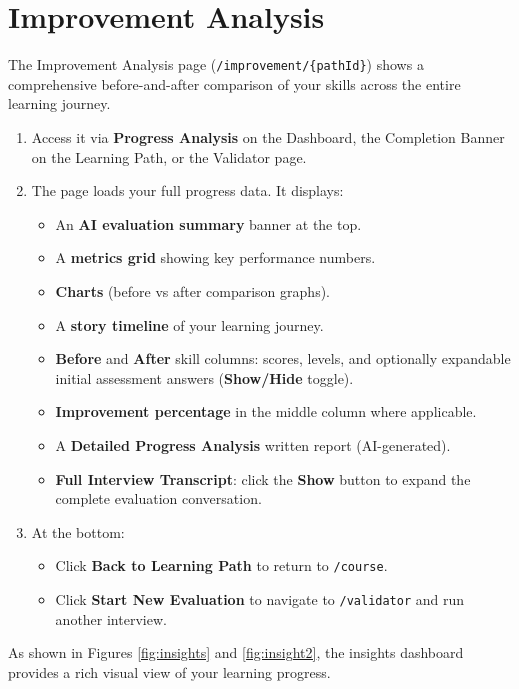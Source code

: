 \documentclass{FastFyp}
\begin{document}
\section{Improvement Analysis}

The Improvement Analysis page (\texttt{/improvement/\{pathId\}}) shows a comprehensive before-and-after comparison of your skills across the entire learning journey.

\begin{enumerate}
    \item Access it via \textbf{Progress Analysis} on the Dashboard, the Completion Banner on the Learning Path, or the Validator page.
    \item The page loads your full progress data. It displays:
        \begin{itemize}
            \item An \textbf{AI evaluation summary} banner at the top.
            \item A \textbf{metrics grid} showing key performance numbers.
            \item \textbf{Charts} (before vs after comparison graphs).
            \item A \textbf{story timeline} of your learning journey.
            \item \textbf{Before} and \textbf{After} skill columns: scores, levels, and optionally expandable initial assessment answers (\textbf{Show/Hide} toggle).
            \item \textbf{Improvement percentage} in the middle column where applicable.
            \item A \textbf{Detailed Progress Analysis} written report (AI-generated).
            \item \textbf{Full Interview Transcript}: click the \textbf{Show} button to expand the complete evaluation conversation.
        \end{itemize}
    \item At the bottom:
        \begin{itemize}
            \item Click \textbf{Back to Learning Path} to return to \texttt{/course}.
            \item Click \textbf{Start New Evaluation} to navigate to \texttt{/validator} and run another interview.
        \end{itemize}
\end{enumerate}

As shown in Figures \ref{fig:insights} and \ref{fig:insight2}, the insights dashboard provides a rich visual view of your learning progress.
\end{document}
